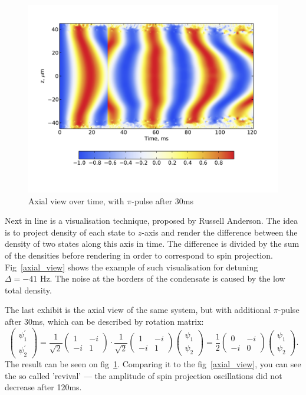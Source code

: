 \documentclass[12pt,notitlepage]{report}
\begin{document}
\begin{figure}
\includegraphics[width=4.5in]{axial_pi_pulse.pdf}
\caption{Axial view over time, with $\pi$-pulse after 30ms}
\label{axial_pi_pulse}
\end{figure}

Next in line is a visualisation technique, proposed by Russell Anderson.
The idea is to project density of each state to $z$-axis
and render the difference between the density of two states along this axis in time.
The difference is divided by the sum of the densities before rendering in order to correspond to spin projection.
Fig~\ref{axial_view} shows the example of such visualisation for detuning $\Delta = -41 \textrm{ Hz}$.
The noise at the borders of the condensate is caused by the low total density.

The last exhibit is the axial view of the same system, but with additional $\pi$-pulse after 30ms,
which can be described by rotation matrix:
\[
\begin{pmatrix}
	\psi^\prime_1 \\	\psi^\prime_2
\end{pmatrix} =
\frac{1}{\sqrt{2}} \begin{pmatrix}
	1 & -i \\ -i & 1
\end{pmatrix} \cdot
\frac{1}{\sqrt{2}} \begin{pmatrix}
	1 & -i \\ -i & 1
\end{pmatrix}
\begin{pmatrix}
	\psi_1 \\ \psi_2
\end{pmatrix} =
\frac{1}{2} \begin{pmatrix}
	0 & -i \\ -i & 0
\end{pmatrix}
\begin{pmatrix}
	\psi_1 \\ \psi_2
\end{pmatrix}.
\]
The result can be seen on fig~\ref{axial_pi_pulse}.
Comparing it to the fig~\ref{axial_view}, you can see the so called 'revival' ---
the amplitude of spin projection oscillations did not decrease after 120ms.
\end{document}
